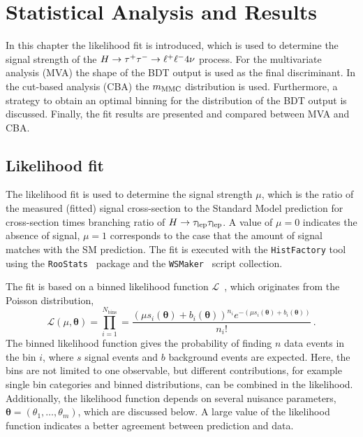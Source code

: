 \chapter{Statistical Analysis and Results}\label{cha:fit}

In this chapter the likelihood fit is introduced, which is used to determine the signal strength of the $H \to \tau^+\tau^- \to \ell^+\ell^- 4\nu$ process.
For the multivariate analysis (MVA) the shape of the BDT output is used as the final discriminant.
In the cut-based analysis (CBA) the $m_\text{MMC}$ distribution is used.
Furthermore, a strategy to obtain an optimal binning for the distribution of the BDT output is discussed.
Finally, the fit results are presented and compared between MVA and CBA\@.

\section{Likelihood fit}

The likelihood fit is used to determine the signal strength $\mu$, which is the ratio of the measured (fitted) signal cross-section to the
Standard Model prediction for cross-section times branching ratio of $H \to \tau_\text{lep} \tau_\text{lep}$.
A value of $\mu = 0$ indicates the absence of signal, $\mu = 1$ corresponds to the case that the amount of signal matches with the SM prediction.
The fit is executed with the \texttt{HistFactory} tool~\cite{HistFactory} using the \texttt{RooStats}~\cite{RooStats} package and the \texttt{WSMaker}~\cite{WSMaker} script collection.

The fit is based on a binned likelihood function $\mathcal{L}$~\cite{FitATLAS}, which originates from the Poisson distribution,
\begin{equation}
    \mathcal{L}(\mu, \bm{\theta}) = \prod_{i=1}^{N_\text{bins}} = \frac{{\left(\mu s_i (\bm{\theta}) + b_i(\bm{\theta})\right)}^{n_i} e^{-(\mu s_i (\bm{\theta}) + b_i(\bm{\theta}))}}{n_i!} \,.
\end{equation}
The binned likelihood function gives the probability of finding $n$ data events in the bin $i$, where $s$ signal events and $b$ background events are expected.
Here, the bins are not limited to one observable, but different contributions, for example single bin categories and binned distributions, can be combined in the likelihood.
Additionally, the likelihood function depends on several nuisance parameters, $\bm{\theta} = (\theta_1, \ldots, \theta_m)$, which are discussed below.
A large value of the likelihood function indicates a better agreement between prediction and data.

